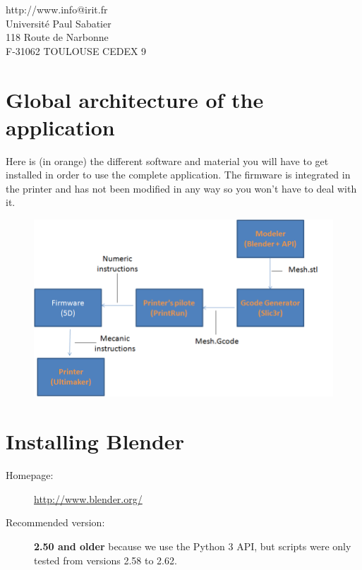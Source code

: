 \documentclass{article}
\begin{document}
\begin{center}
http://www.info@irit.fr\\
Université Paul Sabatier \\
118 Route de Narbonne \\
F-31062 TOULOUSE CEDEX 9
\end{center}

\thispagestyle{empty}

\newpage

\tableofcontents

\newpage

\section{Global architecture of the application}

Here is (in orange) the different software and material you will have to get installed in order to use the complete application. The firmware is integrated in the printer and has not been modified in any way so you won't have to deal with it.

\begin{figure}[!h]
\begin{center}
	\includegraphics[scale=0.4]{ARD1}
\end{center}
\end{figure}

\section{Installing Blender}

\begin{description}
	\item[Homepage:] \url{http://www.blender.org/}
	\item[Recommended version:] \textbf{2.50 and older} because we use the Python 3 API, but scripts were only tested from versions 2.58 to 2.62.
\end{description}
\end{document}
